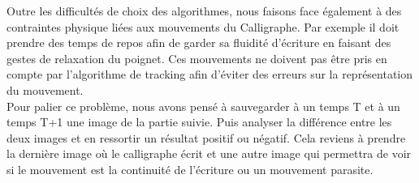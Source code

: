 \documentclass[12pt, letterpaper, twoside]{article}
\begin{document}
Outre les difficult\'es de choix des algorithmes, nous faisons face \'egalement à des contraintes physique li\'ees aux mouvements du Calligraphe. Par exemple il doit prendre des temps de repos afin de garder sa fluidit\'e d'\'ecriture en faisant des gestes de relaxation du poignet. Ces mouvements ne doivent pas \^etre pris en compte par l'algorithme de tracking afin d'\'eviter des erreurs sur la repr\'esentation du mouvement. \\

Pour palier ce probl\`eme, nous avons pens\'e \`a sauvegarder \`a un temps T et \`a un temps T+1 une image de la partie suivie. Puis analyser la diff\'erence entre les deux images et en ressortir un r\'esultat positif ou n\'egatif. Cela reviens \`a prendre la derni\`ere image o\`u le calligraphe \'ecrit et une autre image qui permettra de voir si le mouvement est la continuit\'e de l'\'ecriture ou un mouvement parasite.
 
\end{document}
